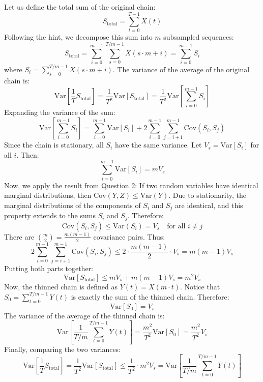 Let us define the total sum of the original chain:
\[
S_{\text{total}} = \sum_{t=0}^{T-1} X(t)
\]
Following the hint, we decompose this sum into $m$ subsampled sequences:
\[
S_{\text{total}} = \sum_{i=0}^{m-1} \sum_{s=0}^{T/m - 1} X(s \cdot m + i) = \sum_{i=0}^{m-1} S_i
\]
where $S_i = \sum_{s=0}^{T/m - 1} X(s \cdot m + i)$.
The variance of the average of the original chain is:
\[
\text{Var}\left[\frac{1}{T}S_{\text{total}}\right] = \frac{1}{T^2} \text{Var}[S_{\text{total}}] = \frac{1}{T^2} \text{Var}\left[\sum_{i=0}^{m-1} S_i\right]
\]
Expanding the variance of the sum:
\[
\text{Var}\left[\sum_{i=0}^{m-1} S_i\right] = \sum_{i=0}^{m-1} \text{Var}[S_i] + 2\sum_{i=0}^{m-1} \sum_{j=i+1}^{m-1} \text{Cov}(S_i, S_j)
\]
Since the chain is stationary, all $S_i$ have the same variance. Let $V_s = \text{Var}[S_i]$ for all $i$. Then:
\[
\sum_{i=0}^{m-1} \text{Var}[S_i] = m V_s
\]
Now, we apply the result from Question 2: If two random variables have identical marginal distributions, then $\text{Cov}(Y, Z) \leq \text{Var}(Y)$. Due to stationarity, the marginal distributions of the components of $S_i$ and $S_j$ are identical, and this property extends to the sums $S_i$ and $S_j$. Therefore:
\[
\text{Cov}(S_i, S_j) \leq \text{Var}(S_i) = V_s \quad \text{for all } i \neq j
\]
There are $\binom{m}{2} = \frac{m(m-1)}{2}$ covariance pairs. Thus:
\[
2\sum_{i=0}^{m-1} \sum_{j=i+1}^{m-1} \text{Cov}(S_i, S_j) \leq 2 \cdot \frac{m(m-1)}{2} \cdot V_s = m(m-1) V_s
\]
Putting both parts together:
\[
\text{Var}[S_{\text{total}}] \leq m V_s + m(m-1) V_s = m^2 V_s
\]
Now, the thinned chain is defined as $Y(t) = X(m \cdot t)$. Notice that $S_0 = \sum_{t=0}^{T/m - 1} Y(t)$ is exactly the sum of the thinned chain. Therefore:
\[
\text{Var}[S_0] = V_s
\]
The variance of the average of the thinned chain is:
\[
\text{Var}\left[\frac{1}{T/m}\sum_{t=0}^{T/m - 1} Y(t)\right] = \frac{m^2}{T^2} \text{Var}[S_0] = \frac{m^2}{T^2} V_s
\]
Finally, comparing the two variances:
\[
\text{Var}\left[\frac{1}{T}S_{\text{total}}\right] = \frac{1}{T^2} \text{Var}[S_{\text{total}}] \leq \frac{1}{T^2} \cdot m^2 V_s = \text{Var}\left[\frac{1}{T/m}\sum_{t=0}^{T/m - 1} Y(t)\right]
\]






